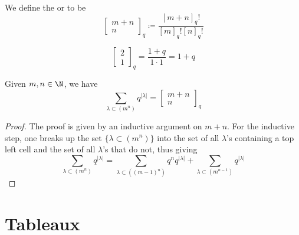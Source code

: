 \documentclass[11pt,leqno,oneside]{amsart}
\numberwithin{thm}{section}
\newcommand{\defeq}{\coloneqq}
\newcommand{\quantumBinom}[3][q]{\left[ \begin{array}{c} #2 \\
                                          #3 \end{array} \right]_#1}
\newcommand{\qbinom}{\quantumBinom}
\begin{document}
\begin{defn}
  We define the  or  to
  be \[
    \qbinom{m+n}{n} \defeq \frac{[m+n]_q!}{[m]_q![n]_q!}
  \]
\end{defn}
\begin{example}
  \[
    \qbinom{2}{1} = \frac{1+q}{1 \cdot 1} = 1+q
  \]
\end{example}
\begin{prop}
  Given \(m,n \in \N\), we have \[
    \sum_{\lambda \subset (m^n)} q^{|\lambda|} = \qbinom{m+n}{n}
  \]
\end{prop}
\begin{proof}
  The proof is given by an inductive argument on \(m+n\). For the
  inductive step, one breaks up the set \(\{\lambda \subset (m^n)\}\)
  into the set of all \(\lambda\)'s containing a top left cell and the
  set of all \(\lambda\)'s that do not, thus giving \[
    \sum_{\lambda \subset (m^n)} q^{|\lambda|} = \sum_{\lambda \subset
    ((m-1)^n)} q^n q^{|\lambda|} + \sum_{\lambda \subset
    (m^{n-1})} q^{|\lambda|}
  \]
\end{proof}
\section{Tableaux}
\end{document}

